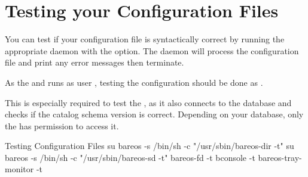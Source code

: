 % 
% 

\section{Testing your Configuration Files}

You can test if your configuration file is syntactically correct by running
the appropriate daemon with the  option. The daemon will process the
configuration file and print any error messages then terminate.

As the \bareosDir and \bareosSd runs as user ,
testing the configuration should be done as .

This is especially required to test the \bareosDir,
as it also connects to the database and checks if the catalog schema version is correct.
Depending on your database, only the  has permission to access it.

\begin{commands}{Testing Configuration Files}
su bareos -s /bin/sh -c "/usr/sbin/bareos-dir -t"
su bareos -s /bin/sh -c "/usr/sbin/bareos-sd -t"
bareos-fd -t
bconsole -t
bareos-tray-monitor -t
\end{commands}

% 



